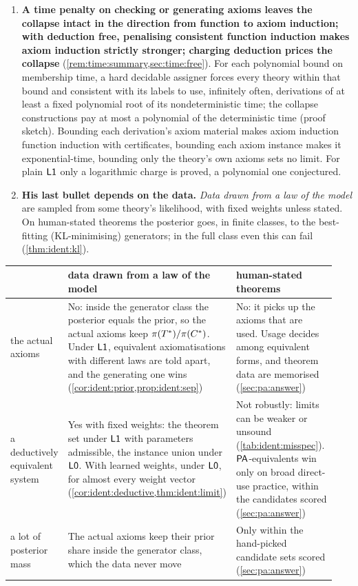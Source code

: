 \begin{enumerate}[label=\textbf{A\arabic*.},leftmargin=*,itemsep=1pt]
\item \textbf{A time penalty on checking or generating axioms leaves the collapse intact in the direction from function to axiom induction; with deduction free, penalising consistent function induction makes axiom induction strictly stronger; charging deduction prices the collapse} (\cref{rem:time:summary,sec:time:free}). For each polynomial bound on membership time, a hard decidable assigner forces every theory within that bound and consistent with its labels to use, infinitely often, derivations of at least a fixed polynomial root of its nondeterministic time; the collapse constructions pay at most a polynomial of the deterministic time (proof sketch). Bounding each derivation's axiom material makes axiom induction function induction with certificates, bounding each axiom instance makes it exponential-time, bounding only the theory's own axioms sets no limit. For plain $\mathord{\mathsf{L1}}$ only a logarithmic charge is proved, a polynomial one conjectured.

\item \textbf{His last bullet depends on the data.} \emph{Data drawn from a law of the model} are sampled from some theory's likelihood, with fixed weights unless stated. On human-stated theorems the posterior goes, in finite classes, to the best-fitting (KL-minimising) generators; in the full class even this can fail (\cref{thm:ident:kl}).

\end{enumerate}
{\footnotesize\crefabbrev\setlength{\LTpre}{2pt}\setlength{\LTpost}{2pt}
\begin{longtable}{@{}>{\raggedright\arraybackslash}p{0.13\linewidth}>{\raggedright\arraybackslash}p{0.405\linewidth}>{\raggedright\arraybackslash}p{0.405\linewidth}@{}}
\toprule
& data drawn from a law of the model & human-stated theorems\\
\midrule
\endhead
the actual axioms & No: inside the generator class the posterior equals the prior, so the actual axioms keep $\pi(T^*)/\pi(C^{*})$. Under $\mathord{\mathsf{L1}}$, equivalent axiomatisations with different laws are told apart, and the generating one wins (\cref{cor:ident:prior,prop:ident:sep}) & No: it picks up the axioms that are used. Usage decides among equivalent forms, and theorem data are memorised (\cref{sec:pa:answer})\\
a deductively equivalent system & Yes with fixed weights: the theorem set under $\mathord{\mathsf{L1}}$ with parameters admissible, the instance union under $\mathord{\mathsf{L0}}$. With learned weights, under $\mathord{\mathsf{L0}}$, for almost every weight vector (\cref{cor:ident:deductive,thm:ident:limit}) & Not robustly: limits can be weaker or unsound (\cref{tab:ident:misspec}). $\mathsf{PA}$-equivalents win only on broad direct-use practice, within the candidates scored (\cref{sec:pa:answer})\\
a lot of posterior mass & The actual axioms keep their prior share inside the generator class, which the data never move & Only within the hand-picked candidate sets scored (\cref{sec:pa:answer})\\
\bottomrule
\end{longtable}}
